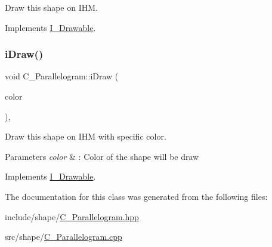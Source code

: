 Draw this shape on I\+HM. 



Implements \hyperlink{classI__Drawable_ae24c65000977a805f52ce032321cd86f}{I\+\_\+\+Drawable}.

\mbox{\label{classC__Parallelogram_a044ce6d1042ea93589a38f4686489862}} 
\subsubsection{\texorpdfstring{i\+Draw()}{iDraw()}\hspace{0.1cm}{\footnotesize\ttfamily [2/2]}}
{\footnotesize\ttfamily void C\+\_\+\+Parallelogram\+::i\+Draw (\begin{DoxyParamCaption}\item[{M\+L\+V\+\_\+\+Color}]{color }\end{DoxyParamCaption})\hspace{0.3cm}{\ttfamily [override]}, {\ttfamily [virtual]}}



Draw this shape on I\+HM with specific color. 


\begin{DoxyParams}{Parameters}
{\em color} & \+: Color of the shape will be draw \\
\hline
\end{DoxyParams}


Implements \hyperlink{classI__Drawable_a25f6474325614c451a91f019e5fe8010}{I\+\_\+\+Drawable}.



The documentation for this class was generated from the following files\+:\begin{DoxyCompactItemize}
\item 
include/shape/\hyperlink{C__Parallelogram_8hpp}{C\+\_\+\+Parallelogram.\+hpp}\item 
src/shape/\hyperlink{C__Parallelogram_8cpp}{C\+\_\+\+Parallelogram.\+cpp}\end{DoxyCompactItemize}
